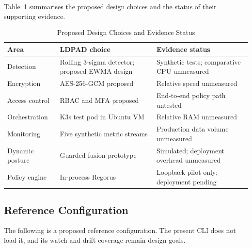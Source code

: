 \documentclass{ieeeaccess}
\renewcommand{\textbf}[1]{#1}
\begin{document}
Table~\ref{tab:complexity} summarises the proposed design choices and the status of their supporting evidence.

\begin{table}[ht]
\caption{Proposed Design Choices and Evidence Status}
\label{tab:complexity}
\centering\footnotesize
\setlength{\tabcolsep}{2pt}
\begin{tabular}{|p{}|p{}|p{}|}
\hline
\textbf{Area} & \textbf{LDPAD choice} & \textbf{Evidence status} \\
\hline
Detection & Rolling 3-sigma detector; proposed EWMA design & Synthetic tests; comparative CPU unmeasured \\
\hline
Encryption & AES-256-GCM proposed & Relative speed unmeasured \\
\hline
Access control & RBAC and MFA proposed & End-to-end policy path untested \\
\hline
Orchestration & K3s test pod in Ubuntu VM & Relative RAM unmeasured \\
\hline
Monitoring & Five synthetic metric streams & Production data volume unmeasured \\
\hline
Dynamic posture & Guarded fusion prototype & Simulated; deployment overhead unmeasured \\
\hline
Policy engine & In-process Regorus & Loopback pilot only; deployment pending \\
\hline
\end{tabular}
\end{table}

\subsection{Reference Configuration}
\label{subsec:refconfig}

The following is a proposed reference configuration. The present CLI does not load it, and its watch and drift coverage remain design goals.
\end{document}
